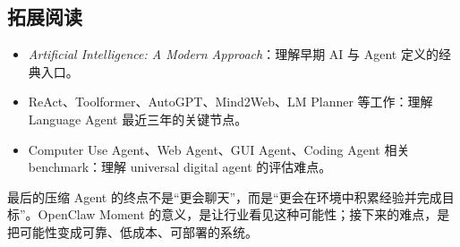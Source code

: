 \documentclass[a4paper]{article}
\begin{document}
\subsection{拓展阅读}

\begin{itemize}
\item \textit{Artificial Intelligence: A Modern Approach}：理解早期 AI 与 Agent 定义的经典入口。
\item ReAct、Toolformer、AutoGPT、Mind2Web、LM Planner 等工作：理解 Language Agent 最近三年的关键节点。
\item Computer Use Agent、Web Agent、GUI Agent、Coding Agent 相关 benchmark：理解 universal digital agent 的评估难点。
\end{itemize}

\begin{importantbox}{最后的压缩}
Agent 的终点不是“更会聊天”，而是“更会在环境中积累经验并完成目标”。OpenClaw Moment 的意义，是让行业看见这种可能性；接下来的难点，是把可能性变成可靠、低成本、可部署的系统。
\end{importantbox}
\end{document}
